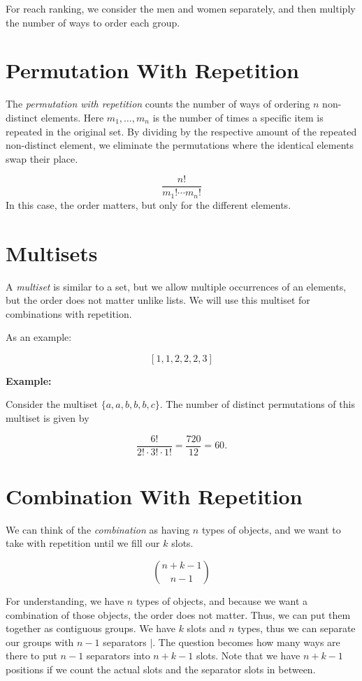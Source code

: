 For reach ranking, we consider the men and women separately, and then multiply the number of ways to order each group.

\section{Permutation With Repetition}

The \emph{permutation with repetition} counts the number of ways of ordering \(n\) non-distinct elements. Here \(m_1, \dots, m_n\)
is the number of times a specific item is repeated in the original set. By dividing by the respective amount of the
repeated non-distinct element, we eliminate the permutations where the identical elements swap their place.

\[
	\frac{n!}{m_1! \cdots m_n!}
\]
In this case, the order matters, but only for the different elements.

\section{Multisets}

A \emph{multiset} is similar to a set, but we allow multiple occurrences of an elements, but the order does not matter unlike lists.
We will use this multiset for combinations with repetition.

As an example:

\[
	[1, 1, 2, 2, 2, 3]
\]

\textbf{Example:}

Consider the multiset \(\{a, a, b, b, b, c\}\). The number of distinct permutations of this multiset is given by

\[
	\frac{6!}{2! \cdot 3! \cdot 1!} = \frac{720}{12} = 60.
\]

\section{Combination With Repetition}

We can think of the \emph{combination} as having \(n\) types of objects, and we want
to take with repetition until we fill our \(k\) slots.

\[
	\binom{n + k - 1}{n - 1}
\]

For understanding, we have \(n\) types of objects, and because we want a combination of those objects, the order does not matter.
Thus, we can put them together as contiguous groups. We have \(k\) slots and \(n\) types, thus we can separate our groups
with \(n - 1\) separators \(|\). The question becomes how many ways are there to put \(n - 1\) separators into \(n + k - 1\) slots. Note
that we have \(n + k - 1\) positions if we count the actual slots and the separator slots in between.

